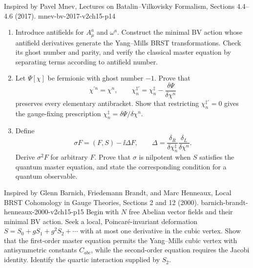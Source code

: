 \begin{enumerate}
  {Inspired by Pavel Mnev, Lectures on Batalin--Vilkovisky Formalism, Sections 4.4--4.6 (2017).}
  {mnev-bv-2017-v2ch15-p14}
  \begin{enumerate}
    \item[(a)]
    Introduce antifields for \(A^a_\mu\) and \(\omega^a\).  Construct the
    minimal BV action whose antifield derivatives generate the Yang--Mills
    BRST transformations.  Check its ghost number and parity, and verify the
    classical master equation by separating terms according to antifield
    number.
    \item[(b)]
    Let \(\Psi[\chi]\) be fermionic with ghost number \(-1\).  Prove that
    \[
      \chi^{\prime n}=\chi^n,\qquad
      \chi_n^{\ddagger\prime}
        =\chi_n^\ddagger-\frac{\delta\Psi}{\delta\chi^n}
    \]
    preserves every elementary antibracket.  Show that restricting
    \(\chi_n^{\ddagger\prime}=0\) gives the gauge-fixing prescription
    \(\chi_n^\ddagger=\delta\Psi/\delta\chi^n\).
    \item[(c)]
    Define
    \[
      \sigma F=(F,S)-\ii\Delta F,\qquad
      \Delta=\frac{\delta_R}{\delta\chi_n^\ddagger}
        \frac{\delta_L}{\delta\chi^n}.
    \]
    Derive \(\sigma^2F\) for arbitrary \(F\).  Prove that \(\sigma\) is
    nilpotent when \(S\) satisfies the quantum master equation, and state the
    corresponding condition for a quantum observable.
  \end{enumerate}

  {Inspired by Glenn Barnich, Friedemann Brandt, and Marc Henneaux, Local BRST Cohomology in Gauge Theories, Sections 2 and 12 (2000).}
  {barnich-brandt-henneaux-2000-v2ch15-p15}
  Begin with \(N\) free Abelian vector fields and their minimal BV action.
  Seek a local, Poincaré-invariant deformation
  \(S=S_0+gS_1+g^2S_2+\cdots\) with at most one derivative in the cubic
  vertex.  Show that the first-order master equation permits the
  Yang--Mills cubic vertex with antisymmetric constants \(C_{abc}\), while
  the second-order equation requires the Jacobi identity.  Identify the
  quartic interaction supplied by \(S_2\).

\end{enumerate}

